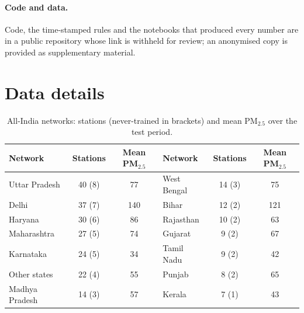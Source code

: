 \documentclass{article}
\newcommand{\pmtf}{PM$_{2.5}$}
\begin{document}
\paragraph{Code and data.} Code, the time-stamped rules and the notebooks that produced every number are in a public
repository whose link is withheld for review; an anonymised copy is provided as supplementary material.
\fi




\newpage
\appendix

\section{Data details}
\label{app:data}

\begin{table}[H]
\caption{All-India networks: stations (never-trained in brackets) and mean \pmtf{} over the test period.}
\centering\small
\begin{tabular}{lcc@{\hspace{2.2em}}lcc}
\toprule
Network & Stations & Mean \pmtf{} & Network & Stations & Mean \pmtf{} \\
\midrule
Uttar Pradesh & 40 (8) & 77 & West Bengal & 14 (3) & 75 \\
Delhi & 37 (7) & 140 & Bihar & 12 (2) & 121 \\
Haryana & 30 (6) & 86 & Rajasthan & 10 (2) & 63 \\
Maharashtra & 27 (5) & 74 & Gujarat & 9 (2) & 67 \\
Karnataka & 24 (5) & 34 & Tamil Nadu & 9 (2) & 42 \\
Other states & 22 (4) & 55 & Punjab & 8 (2) & 65 \\
Madhya Pradesh & 14 (3) & 57 & Kerala & 7 (1) & 43 \\
\bottomrule
\end{tabular}
\end{table}
\end{document}
